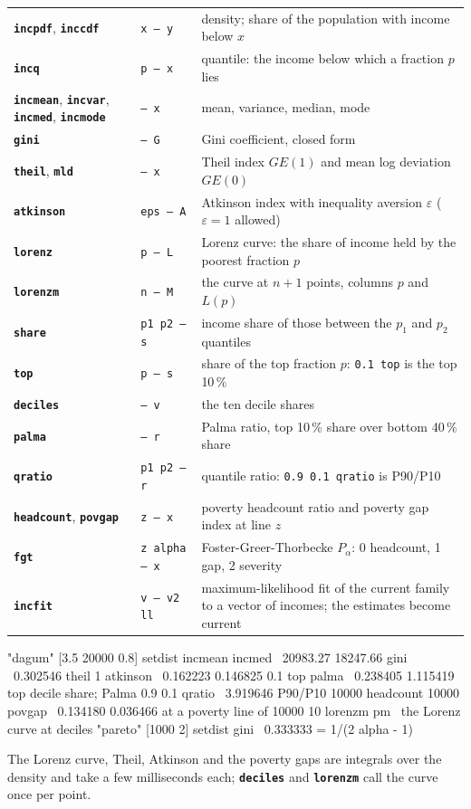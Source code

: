 \documentclass[11pt,letterpaper]{article}
\newcommand{\code}[1]{\texttt{#1}}
\newcommand{\cmd}[1]{\texttt{\textbf{#1}}}
\newcommand{\stk}[1]{\texttt{#1}}
\begin{document}
\begin{center}\small
\begin{tabular}{@{}>{\raggedright\arraybackslash}p{}>{\raggedright\arraybackslash}p{}>{\raggedright\arraybackslash}p{}@{}}
\toprule
\cmd{incpdf}, \cmd{inccdf} & \stk{x -- y} & density; share of the population with income below $x$ \\
\cmd{incq} & \stk{p -- x} & quantile: the income below which a fraction $p$ lies \\
\cmd{incmean}, \cmd{incvar}, \cmd{incmed}, \cmd{incmode} & \stk{-- x} & mean, variance, median, mode \\
\cmd{gini} & \stk{-- G} & Gini coefficient, closed form \\
\cmd{theil}, \cmd{mld} & \stk{-- x} & Theil index $GE(1)$ and mean log deviation $GE(0)$ \\
\cmd{atkinson} & \stk{eps -- A} & Atkinson index with inequality aversion $\varepsilon$ ($\varepsilon = 1$ allowed) \\
\cmd{lorenz} & \stk{p -- L} & Lorenz curve: the share of income held by the poorest fraction $p$ \\
\cmd{lorenzm} & \stk{n -- M} & the curve at $n+1$ points, columns $p$ and $L(p)$ \\
\cmd{share} & \stk{p1 p2 -- s} & income share of those between the $p_1$ and $p_2$ quantiles \\
\cmd{top} & \stk{p -- s} & share of the top fraction $p$: \code{0.1 top} is the top 10\,\% \\
\cmd{deciles} & \stk{-- v} & the ten decile shares \\
\cmd{palma} & \stk{-- r} & Palma ratio, top 10\,\% share over bottom 40\,\% share \\
\cmd{qratio} & \stk{p1 p2 -- r} & quantile ratio: \code{0.9 0.1 qratio} is P90/P10 \\
\cmd{headcount}, \cmd{povgap} & \stk{z -- x} & poverty headcount ratio and poverty gap index at line $z$ \\
\cmd{fgt} & \stk{z alpha -- x} & Foster-Greer-Thorbecke $P_\alpha$: 0 headcount, 1 gap, 2 severity \\
\cmd{incfit} & \stk{v -- v2 ll} & maximum-likelihood fit of the current family to a vector of incomes; the estimates become current \\
\bottomrule
\end{tabular}
\end{center}
\begin{rpn}
"dagum" [3.5 20000 0.8] setdist
incmean incmed                \ 20983.27  18247.66
gini                          \ 0.302546
theil 1 atkinson              \ 0.162223  0.146825
0.1 top palma                 \ 0.238405  1.115419  top decile share; Palma
0.9 0.1 qratio                \ 3.919646  P90/P10
10000 headcount 10000 povgap  \ 0.134180  0.036466  at a poverty line of 10000
10 lorenzm pm                 \ the Lorenz curve at deciles
"pareto" [1000 2] setdist gini  \ 0.333333  = 1/(2 alpha - 1)
\end{rpn}
The Lorenz curve, Theil, Atkinson and the poverty gaps are integrals over the density and take a few milliseconds each; \cmd{deciles} and \cmd{lorenzm} call the curve once per point.
\end{document}

